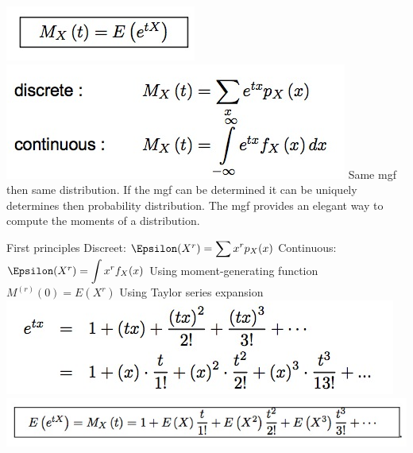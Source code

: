 \documentclass{/out/app/latex/examnotes}
\begin{document}
{
\includegraphics[scale=0.5]{./img/451.jpg}
\includegraphics[scale=0.5]{./img/452.jpg}
\ra Same mgf then same distribution.
\ra If the mgf can be determined it can be uniquely determines then probability distribution. 
\ra The mgf provides an elegant way to compute the moments of a distribution.

\vspace{6pt}
\ra First principles
\vspace{6pt}
\rna Discreet: $\E(X^r)=\displaystyle\sum x^rp_X(x)$
\vspace{6pt}
\rna Continuous:  $\E(X^r)=\displaystyle\int x^rf_X(x)$
\vspace{6pt}
\ra Using moment-generating function
\vspace{6pt}
\rna $M^{(r)}(0)=E(X^r)$ 
\vspace{6pt}
\ra Using Taylor series expansion 
\includegraphics[scale=0.5]{./img/454.jpg}
\includegraphics[scale=0.5]{./img/455.jpg}

}
\end{document}
